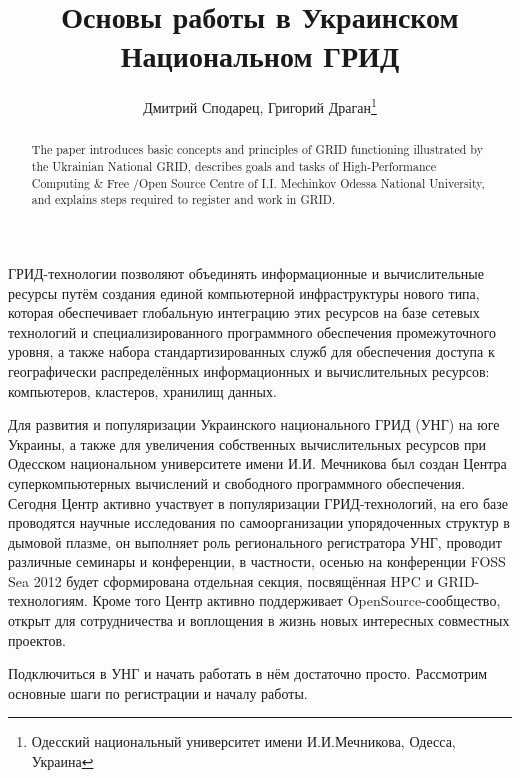 \documentclass[10pt, a5paper]{article}
\begin{document}
\title{Основы работы в Украинском Национальном ГРИД}%

\author{Дмитрий Сподарец, Григорий Драган\footnote{Одесский национальный университет имени И.И.Мечникова, Одесса, Украина}}
\maketitle

\begin{abstract}
The paper introduces basic concepts and principles of GRID functioning illustrated by the Ukrainian National GRID, \linebreak describes goals and tasks of High-Performance Computing \& Free /Open Source Centre of I.I. Mechinkov Odessa National University, and explains steps required to register and work in GRID.
\end{abstract}


ГРИД-технологии позволяют объединять информационные и \linebreak вычислительные ресурсы путём создания единой компьютерной инфраструктуры нового типа, которая обеспечивает глобальную интеграцию этих ресурсов на базе сетевых технологий и специализированного программного обеспечения промежуточного уровня, а также набора стандартизированных служб для обеспечения доступа к географически распределённых информационных и вычислительных ресурсов: компьютеров, кластеров, хранилищ данных.

Для развития и популяризации Украинского национального \linebreak ГРИД (УНГ) на юге Украины, а также для увеличения собственных вычислительных ресурсов при Одесском национальном университете имени И.И. Мечникова был создан Центра суперкомпьютерных вычислений и свободного программного обеспечения. Сегодня Центр активно участвует в популяризации ГРИД-технологий, на его базе проводятся научные исследования по самоорганизации упорядоченных структур в дымовой плазме, он выполняет роль регионального регистратора УНГ, проводит различные семинары и конференции, в частности, осенью на конференции FOSS Sea 2012 будет сформирована отдельная секция, посвящённая HPC и GRID-технологиям. Кроме того Центр активно поддерживает OpenSource-сообщество, открыт для сотрудничества и воплощения в жизнь новых интересных совместных проектов.

Подключиться в УНГ и начать работать в нём достаточно просто. Рассмотрим основные шаги по регистрации и началу работы.
\end{document}
